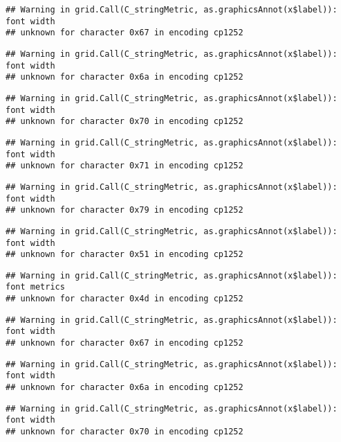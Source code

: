 \documentclass[
]{article}
\begin{document}
\begin{verbatim}
## Warning in grid.Call(C_stringMetric, as.graphicsAnnot(x$label)): font width
## unknown for character 0x67 in encoding cp1252
\end{verbatim}

\begin{verbatim}
## Warning in grid.Call(C_stringMetric, as.graphicsAnnot(x$label)): font width
## unknown for character 0x6a in encoding cp1252
\end{verbatim}

\begin{verbatim}
## Warning in grid.Call(C_stringMetric, as.graphicsAnnot(x$label)): font width
## unknown for character 0x70 in encoding cp1252
\end{verbatim}

\begin{verbatim}
## Warning in grid.Call(C_stringMetric, as.graphicsAnnot(x$label)): font width
## unknown for character 0x71 in encoding cp1252
\end{verbatim}

\begin{verbatim}
## Warning in grid.Call(C_stringMetric, as.graphicsAnnot(x$label)): font width
## unknown for character 0x79 in encoding cp1252
\end{verbatim}

\begin{verbatim}
## Warning in grid.Call(C_stringMetric, as.graphicsAnnot(x$label)): font width
## unknown for character 0x51 in encoding cp1252
\end{verbatim}

\begin{verbatim}
## Warning in grid.Call(C_stringMetric, as.graphicsAnnot(x$label)): font metrics
## unknown for character 0x4d in encoding cp1252
\end{verbatim}

\begin{verbatim}
## Warning in grid.Call(C_stringMetric, as.graphicsAnnot(x$label)): font width
## unknown for character 0x67 in encoding cp1252
\end{verbatim}

\begin{verbatim}
## Warning in grid.Call(C_stringMetric, as.graphicsAnnot(x$label)): font width
## unknown for character 0x6a in encoding cp1252
\end{verbatim}

\begin{verbatim}
## Warning in grid.Call(C_stringMetric, as.graphicsAnnot(x$label)): font width
## unknown for character 0x70 in encoding cp1252
\end{verbatim}
\end{document}
